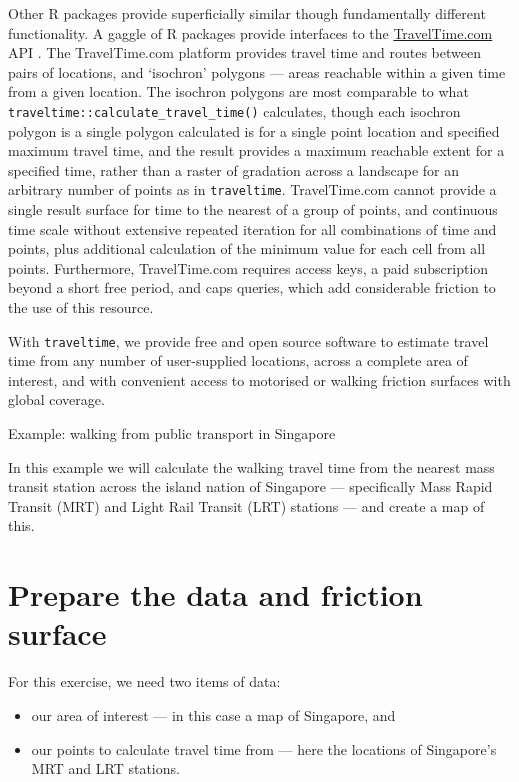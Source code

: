 \documentclass[
  12pt]{article}
\providecommand{\tightlist}{%
  \setlength{\itemsep}{0pt}\setlength{\parskip}{0pt}}\usepackage{longtable,booktabs,array}
\begin{document}
Other R packages provide superficially similar though fundamentally
different functionality. A gaggle of R packages provide interfaces to
the \href{https://www.TravelTime.com}{TravelTime.com} API
\citep{traveltimeapi, traveltimeR, rtraveltime, traveltime_gh}. The
TravelTime.com platform provides travel time and routes between pairs of
locations, and `isochron' polygons --- areas reachable within a given
time from a given location. The isochron polygons are most comparable to
what \texttt{traveltime::calculate\_travel\_time()} calculates, though
each isochron polygon is a single polygon calculated is for a single
point location and specified maximum travel time, and the result
provides a maximum reachable extent for a specified time, rather than a
raster of gradation across a landscape for an arbitrary number of points
as in \texttt{traveltime}. TravelTime.com cannot provide a single result
surface for time to the nearest of a group of points, and continuous
time scale without extensive repeated iteration for all combinations of
time and points, plus additional calculation of the minimum value for
each cell from all points. Furthermore, TravelTime.com requires access
keys, a paid subscription beyond a short free period, and caps queries,
which add considerable friction to the use of this resource.

With \texttt{traveltime}, we provide free and open source software to
estimate travel time from any number of user-supplied locations, across
a complete area of interest, and with convenient access to motorised or
walking friction surfaces with global coverage.

Example: walking from public transport in Singapore

In this example we will calculate the walking travel time from the
nearest mass transit station across the island nation of Singapore ---
specifically Mass Rapid Transit (MRT) and Light Rail Transit (LRT)
stations --- and create a map of this.

\section{Prepare the data and friction
surface}\label{prepare-the-data-and-friction-surface}

For this exercise, we need two items of data:

\begin{itemize}
\tightlist
\item
  our area of interest --- in this case a map of Singapore, and
\item
  our points to calculate travel time from --- here the locations of
  Singapore's MRT and LRT stations.
\end{itemize}
\end{document}
